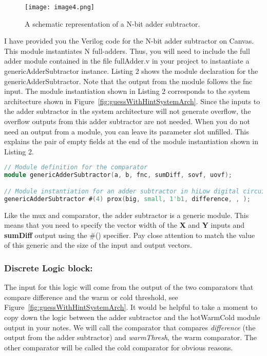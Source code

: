\begin{figure}
\texttt{[image:  image4.png]}
\caption{A schematic representation of a N-bit adder subtractor.}
\label{fig:adderSubSymbol}
\end{figure}

I have provided you the Verilog code for the N-bit adder subtractor on
Canvas. This module instantiates N full-adders. Thus, you will need to
include the full adder module contained in the file fullAdder.v in your
project to instantiate a genericAdderSubtractor instance. Listing 2
shows the module declaration for the genericAdderSubtractor. Note that
the output from the module follows the fnc input. The module
instantiation shown in Listing 2 corresponds to the system architecture
shown in Figure~\ref{fig:guessWithHintSystemArch}. Since the inputs to the adder subtractor in the
system architecture will not generate overflow, the overflow outputs
from this adder subtractor are not needed. When you do not need an
output from a module, you can leave its parameter slot unfilled. This
explains the pair of empty fields at the end of the module instantiation
shown in Listing 2.

\begin{lstlisting}[language=Verilog,
 caption={Top, module definition for an adder subtractor.  Bottom, module instantation 
 of the adder subtractor in Figure~\ref{fig:guessWithHintSystemArch}.},
 label={listing:adderSubtractor},
 frame=single]
// Module definition for the comparator
module genericAdderSubtractor(a, b, fnc, sumDiff, sovf, uovf);

// Module instantiation for an adder subtractor in hiLow digital circuit
genericAdderSubtractor #(4) prox(big, small, 1'b1, difference, , );
\end{lstlisting}


Like the mux and comparator, the adder subtractor is a generic module.
This means that you need to specify the vector width of the \textbf{X}
and \textbf{Y} inputs and \textbf{sumDiff} output using the \#()
specifier. Pay close attention to match the value of this generic and
the size of the input and output vectors.

\hypertarget{discrete-logic-block}{%
\subsubsection{Discrete Logic block:}
\label{discrete-logic-block}}

The input for this logic will come from the output of the two
comparators that compare difference and the warm or cold threshold, see
Figure~\ref{fig:guessWithHintSystemArch}. It would be helpful to take a moment to copy down the logic
between the adder subtractor and the hotWarmCold module output in your
notes. We will call the comparator that compares \emph{difference} (the
output from the adder subtractor) and \emph{warmThresh}, the warm
comparator. The other comparator will be called the cold comparator for
obvious reasons.

